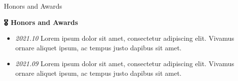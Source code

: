 \begin{section}{Honors and Awards}
\label{sec:honors}

\begin{center}
\huge{\textbf{🎖 Honors and Awards}}
\end{center}

\begin{itemize}
  \item \textit{2021.10} Lorem ipsum dolor sit amet, consectetur adipiscing elit. Vivamus ornare aliquet ipsum, ac tempus justo dapibus sit amet.
  \item \textit{2021.09} Lorem ipsum dolor sit amet, consectetur adipiscing elit. Vivamus ornare aliquet ipsum, ac tempus justo dapibus sit amet.
\end{itemize}
\end{section} 